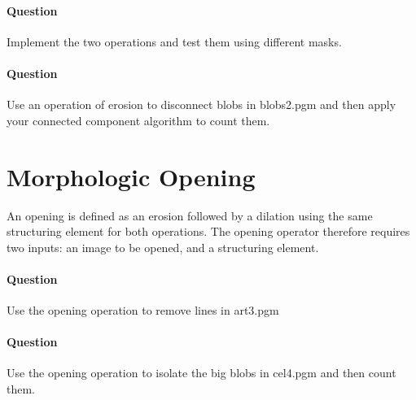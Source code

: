 \documentclass[a4paper, 11pt]{article}
\begin{document}
\paragraph{Question} Implement the two operations and test them using different masks.

\paragraph{Question} Use an operation of erosion to disconnect blobs in blobs2.pgm and then apply your connected component algorithm to count them.

\section*{\bf Morphologic Opening}

An opening is defined as an erosion followed by a dilation using the same structuring element for both operations.
The opening operator therefore requires two inputs: an image to be opened, and a structuring element.

\paragraph{Question} Use the opening operation to remove lines in art3.pgm

\paragraph{Question} Use the opening operation to isolate the big blobs in cel4.pgm and then count them.
\end{document}

